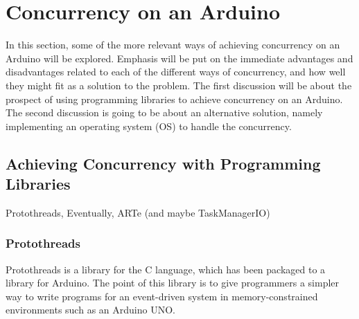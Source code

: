 \section{Concurrency on an Arduino}\label{sec:concurrencyinarduino}
In this section, some of the more relevant ways of achieving concurrency on an Arduino will be explored. Emphasis will be put on the immediate advantages and disadvantages related to each of the different ways of concurrency, and how well they might fit as a solution to the problem. The first discussion will be about the prospect of using programming libraries to achieve concurrency on an Arduino. The second discussion is going to be about an alternative solution, namely implementing an operating system (OS) to handle the concurrency.


\subsection{Achieving Concurrency with Programming Libraries}
Protothreads, Eventually, ARTe (and maybe TaskManagerIO)


\subsubsection{Protothreads}
Protothreads is a library for the C language, which has been packaged to a library for Arduino. The point of this library is to give programmers a simpler way to write programs for an event-driven system in memory-constrained environments such as an Arduino UNO.


